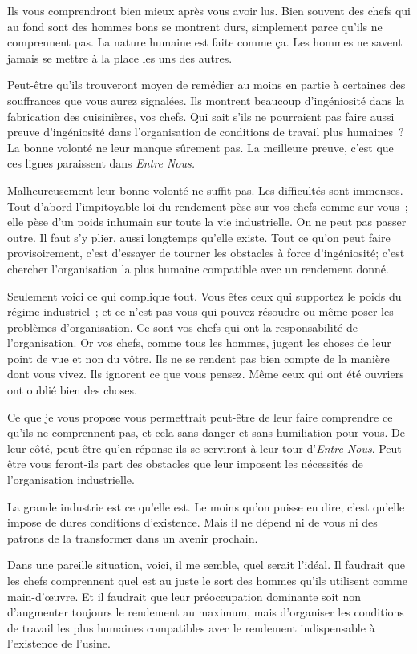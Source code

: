 \documentclass[french,twoside]{book} %
\begin{document}
Ils vous comprendront bien mieux après vous avoir lus. Bien souvent des chefs qui au fond sont des hommes bons se montrent durs, simplement parce qu'ils ne comprennent pas. La nature humaine est faite comme ça. Les hommes ne savent jamais se mettre à la place les uns des autres.\par
Peut-être qu'ils trouveront moyen de remédier au moins en partie à certaines des souffrances que vous aurez signalées. Ils montrent beaucoup d'ingéniosité dans la fabrication des cuisinières, vos chefs. Qui sait s'ils ne pourraient pas faire aussi preuve d'ingéniosité dans l'organisation de conditions de travail plus humaines ? La bonne volonté ne leur manque sûrement pas. La meilleure preuve, c'est que ces lignes paraissent dans {\itshape Entre Nous.}\par
Malheureusement leur bonne volonté ne suffit pas. Les difficultés sont immenses. Tout d'abord l'impitoyable loi du rendement pèse sur vos chefs comme sur vous ; elle pèse d'un poids inhumain sur toute la vie industrielle. On ne peut pas passer outre. Il faut s'y plier, aussi longtemps qu'elle existe. Tout ce qu'on peut faire provisoirement, c'est d'essayer de tourner les obstacles à force d'ingéniosité; c'est chercher l'organisation la plus humaine compatible avec un rendement donné.\par
Seulement voici ce qui complique tout. Vous êtes ceux qui supportez le poids du régime industriel ; et ce n'est pas vous qui pouvez résoudre ou même poser les problèmes d'organisation. Ce sont vos chefs qui ont la responsabilité de l'organisation. Or vos chefs, comme tous les hommes, jugent les choses de leur point de vue et non du vôtre. Ils ne se rendent pas bien compte de la manière dont vous vivez. Ils ignorent ce que vous pensez. Même ceux qui ont été ouvriers ont oublié bien des choses.\par
Ce que je vous propose vous permettrait peut-être de leur faire comprendre ce qu'ils ne comprennent pas, et cela sans danger et sans humiliation pour vous. De leur côté, peut-être qu'en réponse ils se serviront à leur tour d'{\itshape Entre Nous}. Peut-être vous feront-ils part des obstacles que leur imposent les nécessités de l'organisation industrielle.\par
La grande industrie est ce qu'elle est. Le moins qu'on puisse en dire, c'est qu'elle impose de dures conditions d'existence. Mais il ne dépend ni de vous ni des patrons de la transformer dans un avenir prochain.\par
Dans une pareille situation, voici, il me semble, quel serait l'idéal. Il faudrait que les chefs comprennent quel est au juste le sort des hommes qu'ils utilisent comme main-d'œuvre. Et il faudrait que leur préoccupation dominante soit non d'augmenter toujours le rendement au maximum, mais d'organiser les conditions de travail les plus humaines compatibles avec le rendement indispensable à l'existence de l'usine.\par
\end{document}
